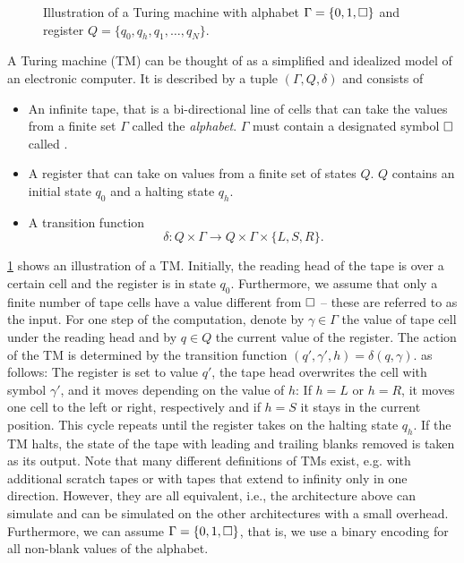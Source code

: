 \begin{figure*}
  \centering
  
  \caption{\label{fig:complexity.turingmachine}
    Illustration of a Turing machine with alphabet $\Gamma = \{0, 1, \square\}$ and register $Q = \{q_0, q_h, q_1, \ldots, q_N\}$.
    }
\end{figure*}

A Turing machine (TM) can be thought of as a simplified and idealized model of an electronic computer.
It is described by a tuple $(\Gamma, Q, \delta)$ and consists of
\begin{itemize}
  \item An infinite tape, that is a bi-directional line of cells that can take the values from a finite set $\Gamma$ called the \emph{alphabet}.
    $\Gamma$ must contain a designated symbol $\square$ called .
  \item A register that can take on values from a finite set of states $Q$.
    $Q$ contains an initial state $q_0$ and a halting state $q_h$.
  \item A transition function
    \[
      \delta\colon Q \times \Gamma \to Q \times \Gamma \times \{L, S, R\}.
    \]
\end{itemize}
\cref{fig:complexity.turingmachine} shows an illustration of a TM.
Initially, the reading head of the tape is over a certain cell and the register is in state $q_0$.
Furthermore, we assume that only a finite number of tape cells have a value different from $\square$ -- these are referred to as the input.
For one step of the computation, denote by $\gamma \in \Gamma$ the value of tape cell under the reading head and by $q \in Q$ the current value of the register.
The action of the TM is determined by the transition function
\(
  (q', \gamma', h) = \delta(q, \gamma).
\)
as follows:
The register is set to value $q'$, the tape head overwrites the cell with symbol $\gamma'$, and it moves depending on the value of $h$:
If $h = L$ or $h = R$, it moves one cell to the left or right, respectively and if $h = S$ it stays in the current position.
This cycle repeats until the register takes on the halting state $q_h$.
If the TM halts, the state of the tape with leading and trailing blanks removed is taken as its output.
Note that many different definitions of TMs exist, e.g. with additional scratch tapes or with tapes that extend to infinity only in one direction.
However, they are all equivalent, i.e., the architecture above can simulate and can be simulated on the other architectures with a small overhead.
Furthermore, we can assume $\Gamma = \{0, 1, \square\}$, that is, we use a binary encoding for all non-blank values of the alphabet.

